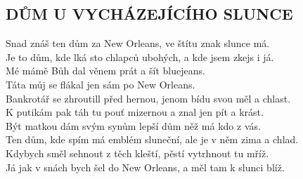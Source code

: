\begin{flushleft}
	\section*{\Huge DŮM U VYCHÁZEJÍCÍHO SLUNCE}
\end{flushleft}

Snad znáš ten dům za New Orleans, ve štítu znak slunce má.\\
Je to dům, kde lká sto chlapců ubohých, a kde jsem zkejs i já.\hspace{0,5cm}\\

Mé mámě Bůh dal věnem prát a šít bluejeans.\\
Táta můj se flákal jen sám po New Orleans.\\

Bankrotář se zhroutill před hernou, jenom bídu svou měl a chlast.\\
K putikám pak táh tu pouť mizernou a znal jen pít a krást.\\

Být matkou dám svým synům lepší dům něž má kdo z vás.\\
Ten dům, kde spím má emblém sluneční, ale je v něm zima a chlad.\\

Kdybych směl sehnout z těch kleští, pěstí vytrhnout tu mříž.\\
Já jak v snách bych šel do New Orleans, a měl tam k slunci blíž.\\

\newpage
